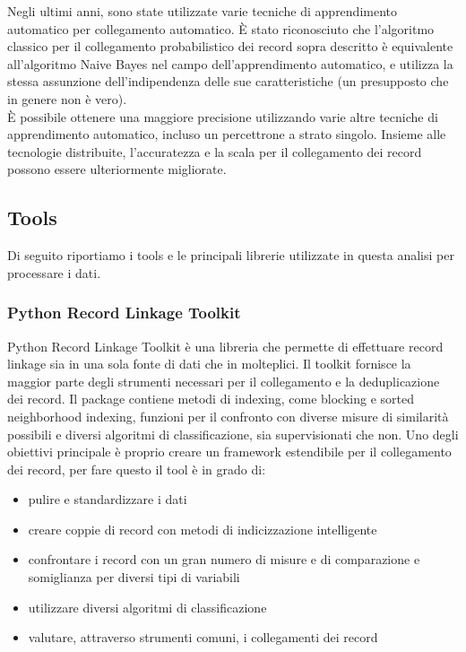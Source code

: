 \documentclass[a4paper,12pt]{article}
\begin{document}
\begin{description}[align=left]
	\item[Machine learning] Negli ultimi anni, sono state utilizzate varie tecniche di apprendimento automatico per collegamento automatico. È stato riconosciuto che l'algoritmo classico per il collegamento probabilistico dei record sopra descritto è equivalente all'algoritmo Naive Bayes nel campo dell'apprendimento automatico, e utilizza la stessa assunzione dell'indipendenza delle sue caratteristiche (un presupposto che in genere non è vero).\\È possibile ottenere una maggiore precisione utilizzando varie altre tecniche di apprendimento automatico, incluso un percettrone a strato singolo. Insieme alle tecnologie distribuite, l'accuratezza e la scala per il collegamento dei record possono essere ulteriormente migliorate.	
\end{description}

\subsection{Tools}
Di seguito riportiamo i tools e le principali librerie utilizzate in questa analisi per processare i dati.

\subsubsection{Python Record Linkage Toolkit}
Python Record Linkage Toolkit è una libreria che permette di effettuare record linkage sia in una sola fonte di dati che in molteplici. Il toolkit fornisce la maggior parte degli strumenti necessari per il collegamento e la deduplicazione dei record.
Il package contiene metodi di indexing, come blocking e sorted neighborhood indexing, funzioni per il confronto con diverse misure di similarità possibili e diversi algoritmi di classificazione, sia supervisionati che non. 
Uno degli obiettivi principale è proprio creare un framework estendibile per il collegamento dei record, per fare questo il tool è in grado di:
\begin{itemize}
\item pulire e standardizzare i dati
\item creare coppie di record con metodi di indicizzazione intelligente
\item confrontare i record con un gran numero di misure e di comparazione e somiglianza per diversi tipi di variabili
\item utilizzare diversi algoritmi di classificazione
\item valutare, attraverso strumenti comuni, i collegamenti dei record
\end{itemize} 
\end{document}
